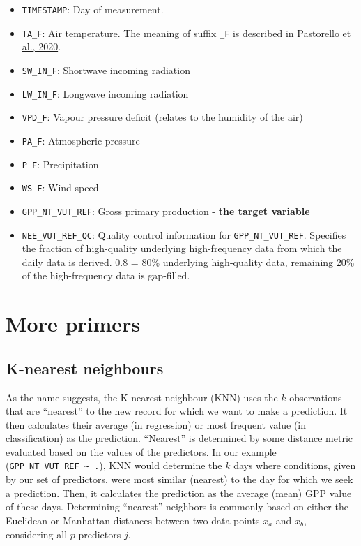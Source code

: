 \documentclass[
]{book}
\providecommand{\tightlist}{%
  \setlength{\itemsep}{0pt}\setlength{\parskip}{0pt}}
\begin{document}
\begin{itemize}
\tightlist
\item
  \texttt{TIMESTAMP}: Day of measurement.
\item
  \texttt{TA\_F}: Air temperature. The meaning of suffix \texttt{\_F} is described in \href{https://www.nature.com/articles/s41597-020-0534-3}{Pastorello et al., 2020}.
\item
  \texttt{SW\_IN\_F}: Shortwave incoming radiation
\item
  \texttt{LW\_IN\_F}: Longwave incoming radiation
\item
  \texttt{VPD\_F}: Vapour pressure deficit (relates to the humidity of the air)
\item
  \texttt{PA\_F}: Atmospheric pressure
\item
  \texttt{P\_F}: Precipitation
\item
  \texttt{WS\_F}: Wind speed
\item
  \texttt{GPP\_NT\_VUT\_REF}: Gross primary production - \textbf{the target variable}
\item
  \texttt{NEE\_VUT\_REF\_QC}: Quality control information for \texttt{GPP\_NT\_VUT\_REF}. Specifies the fraction of high-quality underlying high-frequency data from which the daily data is derived. 0.8 = 80\% underlying high-quality data, remaining 20\% of the high-frequency data is gap-filled.
\end{itemize}

\hypertarget{more-primers}{%
\section{More primers}\label{more-primers}}

\hypertarget{k-nearest-neighbours}{%
\subsection{K-nearest neighbours}\label{k-nearest-neighbours}}

As the name suggests, the K-nearest neighbour (KNN) uses the \(k\) observations that are ``nearest'' to the new record for which we want to make a prediction. It then calculates their average (in regression) or most frequent value (in classification) as the prediction. ``Nearest'' is determined by some distance metric evaluated based on the values of the predictors. In our example (\texttt{GPP\_NT\_VUT\_REF\ \textasciitilde{}\ .}), KNN would determine the \(k\) days where conditions, given by our set of predictors, were most similar (nearest) to the day for which we seek a prediction. Then, it calculates the prediction as the average (mean) GPP value of these days. Determining ``nearest'' neighbors is commonly based on either the Euclidean or Manhattan distances between two data points \(x_a\) and \(x_b\), considering all \(p\) predictors \(j\).
\end{document}

